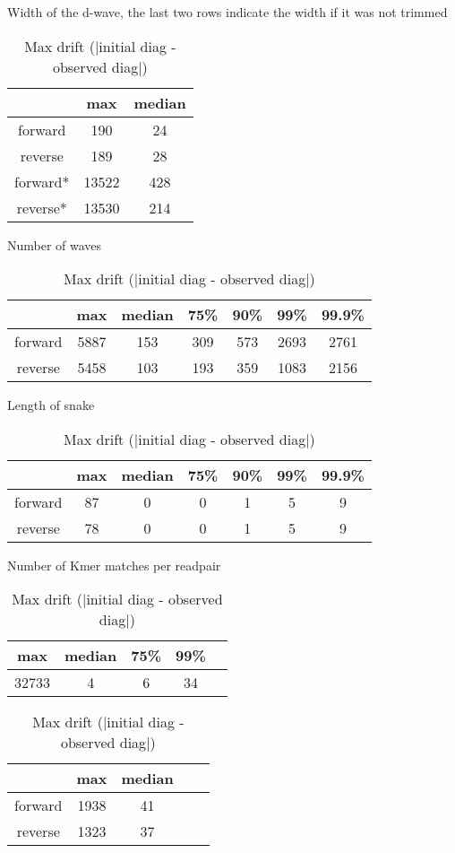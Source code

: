 \documentclass[../main/thesis.tex]{subfiles}
\begin{document}
\begin{table}[h]
\caption{Width of the d-wave, the last two rows indicate the width if it was not trimmed}
\label{tbl:daligner_dist1}
\centering
\vspace{-5pt}
\begin{tabular}{c|c c}
& max & median \\ \hline
forward & 190 & 24 \\
reverse & 189 & 28 \\ \hline
forward* & 13522 & 428 \\
reverse* & 13530 & 214 \\
\end{tabular}

\bigskip
\caption{Number of waves}
\label{tbl:daligner_dist2}
\centering
\vspace{-5pt}
\begin{tabular}{c|c c c c c c}
& max & median & 75\% & 90\% & 99\% & 99.9\% \\ \hline
forward & 5887 & 153 & 309 & 573 & 2693 & 2761 \\
reverse & 5458 & 103 & 193 & 359 & 1083 & 2156 \\
\end{tabular}

\bigskip
\caption{Length of snake}
\label{tbl:daligner_dist3}
\centering
\vspace{-5pt}
\begin{tabular}{c|c c c c c c}
& max & median & 75\% & 90\% & 99\% & 99.9\% \\ \hline
forward & 87 & 0 & 0 & 1 & 5 & 9 \\
reverse & 78 & 0 & 0 & 1 & 5 & 9 \\
\end{tabular}

\bigskip
\caption{Number of Kmer matches per readpair}
\label{tbl:daligner_dist4}
\centering
\vspace{-5pt}
\begin{tabular}{c|c c c c}
max & median & 75\% & 99\% \\ \hline
32733 & 4 & 6 & 34 \\
\end{tabular}

\bigskip
\caption{Max drift ($\mid$initial diag - observed diag$\mid$)}
\label{tbl:daligner_dist5}
\centering
\vspace{-5pt}
\begin{tabular}{c|c c c c}
& max & median \\ \hline
forward & 1938 & 41 \\
reverse & 1323 & 37 \\
\end{tabular}


\end{table}
\end{document}
